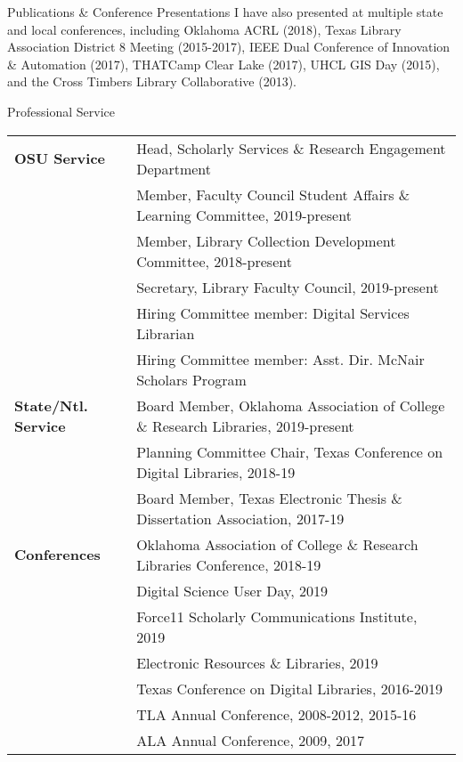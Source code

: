 \documentclass{resume} %
\begin{document}
\begin{rSection}{Publications \& Conference Presentations}
I have also presented at multiple state and local conferences, including Oklahoma ACRL (2018), Texas Library Association District 8 Meeting (2015-2017), IEEE Dual Conference of Innovation \& Automation (2017), THATCamp Clear Lake (2017), UHCL GIS Day (2015), and the Cross Timbers Library Collaborative (2013).


\end{rSection}

\pagebreak

\begin{rSection}{Professional Service}

\begin{tabular}{ @{} >{\bfseries}l @{\hspace{2ex}} l }
OSU Service & Head, Scholarly Services \& Research Engagement Department \\
	& Member, Faculty Council Student Affairs \& Learning Committee, 2019-present \\
	& Member, Library Collection Development Committee, 2018-present \\
	& Secretary, Library Faculty Council, 2019-present \\
	& Hiring Committee member: Digital Services Librarian \\
	& Hiring Committee member: Asst. Dir. McNair Scholars Program \\
State/Ntl. Service & Board Member, Oklahoma Association of College \& Research Libraries, 2019-present \\
	& Planning Committee Chair, Texas Conference on Digital Libraries, 2018-19 \\
	& Board Member, Texas Electronic Thesis \& Dissertation Association, 2017-19 \\
Conferences & Oklahoma Association of College \& Research Libraries Conference, 2018-19 \\
	& Digital Science User Day, 2019 \\
	& Force11 Scholarly Communications Institute, 2019 \\
	& Electronic Resources \& Libraries, 2019 \\
	& Texas Conference on Digital Libraries, 2016-2019 \\
	 & TLA Annual Conference, 2008-2012, 2015-16 \\
	 & ALA Annual Conference, 2009, 2017 \\

\end{tabular}
\end{rSection}
\end{document}
